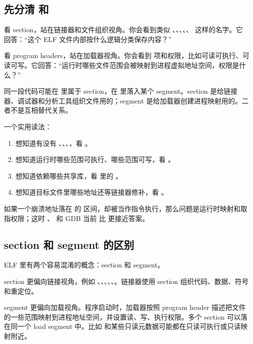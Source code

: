 \subsection{先分清  和 }

 看 section，站在链接器和文件组织视角。你会看到类似 、、、、、 这样的名字。它回答：“这个 ELF 文件内部按什么逻辑分类保存内容？”

 看 program headers，站在加载器视角。你会看到  项和权限，比如可读可执行、可读可写。它回答：“运行时哪些文件范围会被映射到进程虚拟地址空间，权限是什么？”

同一段代码可能在  里属于  section，在  里落入某个  segment。section 是给链接器、调试器和分析工具组织文件用的；segment 是给加载器创建进程映射用的。二者不是互相替代关系。

一个实用读法：

\begin{enumerate}
  \item 想知道有没有 、、、，看 。
  \item 想知道运行时哪些范围可执行、哪些范围可写，看 。
  \item 想知道依赖哪些共享库，看  里的 。
  \item 想知道目标文件里哪些地址还等链接器修补，看 。
\end{enumerate}

如果一个崩溃地址落在  的  区间，却被当作指令执行，那么问题是运行时映射和取指权限；这时 、 和 GDB 当前  比  更接近答案。

\subsection{section 和 segment 的区别}

ELF 里有两个容易混淆的概念：section 和 segment。

section 更偏向链接视角，例如 、、、、、。链接器使用 section 组织代码、数据、符号和重定位。

segment 更偏向加载视角。程序启动时，加载器按照 program header 描述把文件的一些范围映射到进程地址空间，并设置读、写、执行权限。多个 section 可以落在同一个 load segment 中。比如  和某些只读元数据可能都在只读可执行或只读映射附近。


